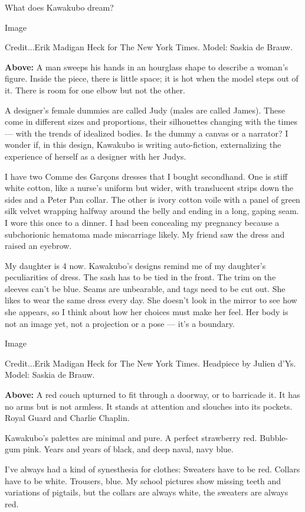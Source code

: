 What does Kawakubo dream?

Image

Credit...Erik Madigan Heck for The New York Times. Model: Saskia de
Brauw.

\textbf{Above:} A man sweeps his hands in an hourglass shape to describe
a woman's figure. Inside the piece, there is little space; it is hot
when the model steps out of it. There is room for one elbow but not the
other.

A designer's female dummies are called Judy (males are called James).
These come in different sizes and proportions, their silhouettes
changing with the times --- with the trends of idealized bodies. Is the
dummy a canvas or a narrator? I wonder if, in this design, Kawakubo is
writing auto-fiction, externalizing the experience of herself as a
designer with her Judys.

I have two Comme des Garçons dresses that I bought secondhand. One is
stiff white cotton, like a nurse's uniform but wider, with translucent
strips down the sides and a Peter Pan collar. The other is ivory cotton
voile with a panel of green silk velvet wrapping halfway around the
belly and ending in a long, gaping seam. I wore this once to a dinner. I
had been concealing my pregnancy because a subchorionic hematoma made
miscarriage likely. My friend saw the dress and raised an eyebrow.

My daughter is 4 now. Kawakubo's designs remind me of my daughter's
peculiarities of dress. The sash has to be tied in the front. The trim
on the sleeves can't be blue. Seams are unbearable, and tags need to be
cut out. She likes to wear the same dress every day. She doesn't look in
the mirror to see how she appears, so I think about how her choices must
make her feel. Her body is not an image yet, not a projection or a pose
--- it's a boundary.

Image

Credit...Erik Madigan Heck for The New York Times. Headpiece by Julien
d'Ys. Model: Saskia de Brauw.

\textbf{Above:} A red couch upturned to fit through a doorway, or to
barricade it. It has no arms but is not armless. It stands at attention
and slouches into its pockets. Royal Guard and Charlie Chaplin.

Kawakubo's palettes are minimal and pure. A perfect strawberry red.
Bubble-gum pink. Years and years of black, and deep naval, navy blue.

I've always had a kind of synesthesia for clothes: Sweaters have to be
red. Collars have to be white. Trousers, blue. My school pictures show
missing teeth and variations of pigtails, but the collars are always
white, the sweaters are always red.

